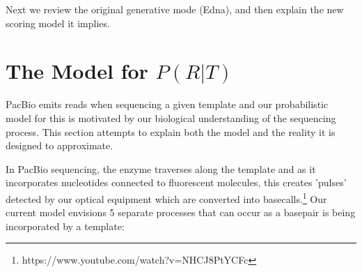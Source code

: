 \documentclass[fleqn,10pt]{SelfArx} %
\begin{document}
Next we review the original generative mode (Edna), and then explain the new scoring model it implies.


\section{The Model for $P(R|T)$}

PacBio emits reads when sequencing a given template and our probabilistic model for this is motivated by our biological understanding of the sequencing process.  This section attempts to explain both the model and the reality it is designed to approximate.

In PacBio sequencing, the enzyme traverses along the template and as it incorporates nucleotides connected to fluorescent molecules, this creates 'pulses' detected by our optical equipment which are converted into basecalls.\footnote{https://www.youtube.com/watch?v=NHCJ8PtYCFc}  Our current model envisions 5 separate processes that can occur as a basepair is being incorporated by a template:
\end{document}
